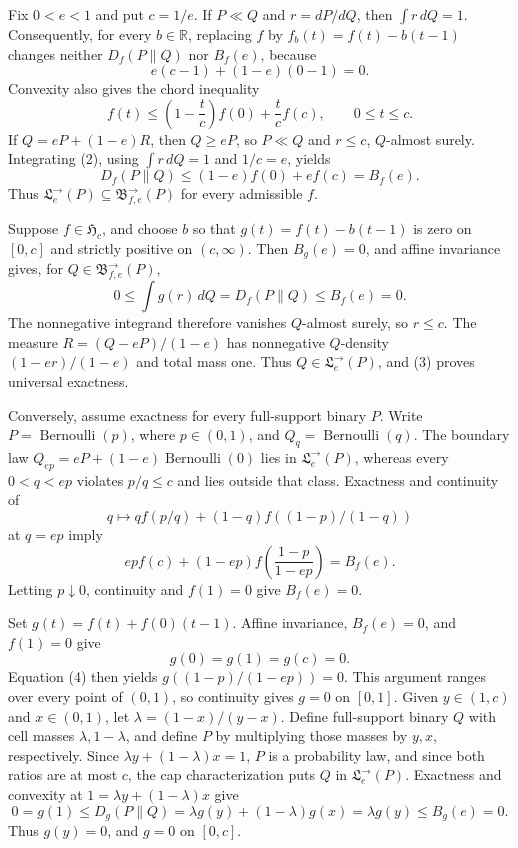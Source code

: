 Fix \(0<e<1\) and put \(c=1/e\).  If \(P\ll Q\) and \(r=dP/dQ\), then \(\int r\,dQ=1\).  Consequently, for every \(b\in\mathbb R\), replacing \(f\) by \(f_b(t)=f(t)-b(t-1)\) changes neither \(D_f(P\|Q)\) nor \(B_f(e)\), because
\[
 e(c-1)+(1-e)(0-1)=0. \tag{1}
\]
Convexity also gives the chord inequality
\[
 f(t)\le \left(1-\frac{t}{c}\right)f(0)+\frac{t}{c}f(c),\qquad 0\le t\le c. \tag{2}
\]
If \(Q=eP+(1-e)R\), then \(Q\ge eP\), so \(P\ll Q\) and \(r\le c\), \(Q\)-almost surely.  Integrating (2), using \(\int r\,dQ=1\) and \(1/c=e\), yields
\[
 D_f(P\|Q)\le (1-e)f(0)+ef(c)=B_f(e). \tag{3}
\]
Thus \(\mathfrak L^{\to}_e(P)\subseteq\mathfrak B^{\to}_{f,e}(P)\) for every admissible \(f\).

Suppose \(f\in\mathfrak H_c\), and choose \(b\) so that \(g(t)=f(t)-b(t-1)\) is zero on \([0,c]\) and strictly positive on \((c,\infty)\).  Then \(B_g(e)=0\), and affine invariance gives, for \(Q\in\mathfrak B^{\to}_{f,e}(P)\),
\[
 0\le\int g(r)\,dQ=D_f(P\|Q)\le B_f(e)=0.
\]
The nonnegative integrand therefore vanishes \(Q\)-almost surely, so \(r\le c\).  The measure \(R=(Q-eP)/(1-e)\) has nonnegative \(Q\)-density \((1-er)/(1-e)\) and total mass one.  Thus \(Q\in\mathfrak L^{\to}_e(P)\), and (3) proves universal exactness.

Conversely, assume exactness for every full-support binary \(P\).  Write \(P=\operatorname{Bernoulli}(p)\), where \(p\in(0,1)\), and \(Q_q=\operatorname{Bernoulli}(q)\).  The boundary law \(Q_{ep}=eP+(1-e)\operatorname{Bernoulli}(0)\) lies in \(\mathfrak L^{\to}_e(P)\), whereas every \(0<q<ep\) violates \(p/q\le c\) and lies outside that class.  Exactness and continuity of
\[
 q\longmapsto qf(p/q)+(1-q)f((1-p)/(1-q))
\]
at \(q=ep\) imply
\[
 epf(c)+(1-ep)f\!\left(\frac{1-p}{1-ep}\right)=B_f(e). \tag{4}
\]
Letting \(p\downarrow0\), continuity and \(f(1)=0\) give \(B_f(e)=0\).

Set \(g(t)=f(t)+f(0)(t-1)\).  Affine invariance, \(B_f(e)=0\), and \(f(1)=0\) give
\[
 g(0)=g(1)=g(c)=0. \tag{5}
\]
Equation (4) then yields \(g((1-p)/(1-ep))=0\).  This argument ranges over every point of \((0,1)\), so continuity gives \(g=0\) on \([0,1]\).  Given \(y\in(1,c)\) and \(x\in(0,1)\), let \(\lambda=(1-x)/(y-x)\).  Define full-support binary \(Q\) with cell masses \(\lambda,1-\lambda\), and define \(P\) by multiplying those masses by \(y,x\), respectively.  Since \(\lambda y+(1-\lambda)x=1\), \(P\) is a probability law, and since both ratios are at most \(c\), the cap characterization puts \(Q\) in \(\mathfrak L^{\to}_e(P)\).  Exactness and convexity at \(1=\lambda y+(1-\lambda)x\) give
\[
 0=g(1)\le D_g(P\|Q)=\lambda g(y)+(1-\lambda)g(x)=\lambda g(y)\le B_g(e)=0.
\]
Thus \(g(y)=0\), and \(g=0\) on \([0,c]\).

